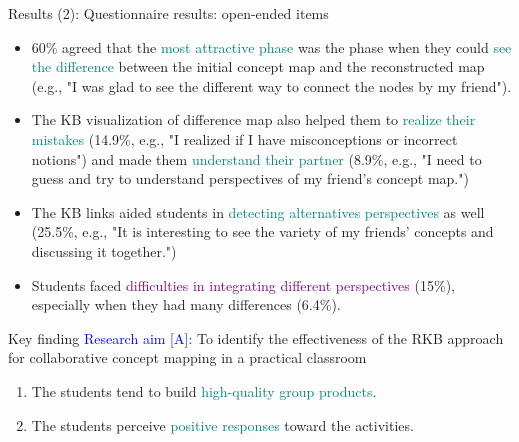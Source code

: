 \begin{frame}{Results (2): Questionnaire results: open-ended items}
\begin{itemize}
    \item <1> 60\% agreed that the \textcolor{teal}{most attractive phase} was the phase when they could \textcolor{teal}{see the difference} between the initial concept map and the reconstructed map (e.g., "I was glad to see the different way to connect the nodes by my friend").
    \item <2> The KB visualization of difference map also helped them to \textcolor{teal}{realize their mistakes} (14.9\%, e.g., "I realized if I have misconceptions or incorrect notions") and made them \textcolor{teal}{understand  their partner} (8.9\%, e.g., "I need to guess and try to understand perspectives of my friend's concept map.")
    \item <3> The KB links aided students in \textcolor{teal}{detecting alternatives perspectives} as well (25.5\%, e.g., "It is interesting to see the variety of my friends’ concepts and discussing it together.")
    \item <4> Students faced \textcolor{purple}{difficulties in integrating different perspectives} (15\%), especially when they had many differences (6.4\%).
\end{itemize}
\end{frame}
\begin{frame}{Key finding}
\textcolor{blue}{Research aim [A]}: To identify the effectiveness of the RKB approach for collaborative concept mapping in a practical classroom
\begin{block}{}
    \begin{enumerate}
        \item The students tend to build \textcolor{teal}{high-quality group products}. 
        \item The students perceive \textcolor{teal}{positive responses} toward the activities.  
    \end{enumerate}
   
\end{block}

\end{frame}


